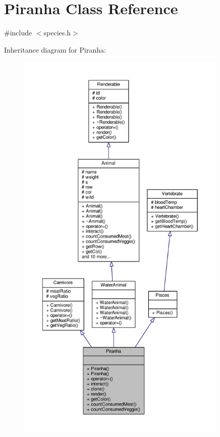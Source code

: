 \hypertarget{classPiranha}{}\section{Piranha Class Reference}
\label{classPiranha}


{\ttfamily \#include $<$species.\+h$>$}



Inheritance diagram for Piranha\+:
\nopagebreak
\begin{figure}[H]
\begin{center}
\leavevmode
\includegraphics[height=550pt]{classPiranha__inherit__graph}
\end{center}
\end{figure}


